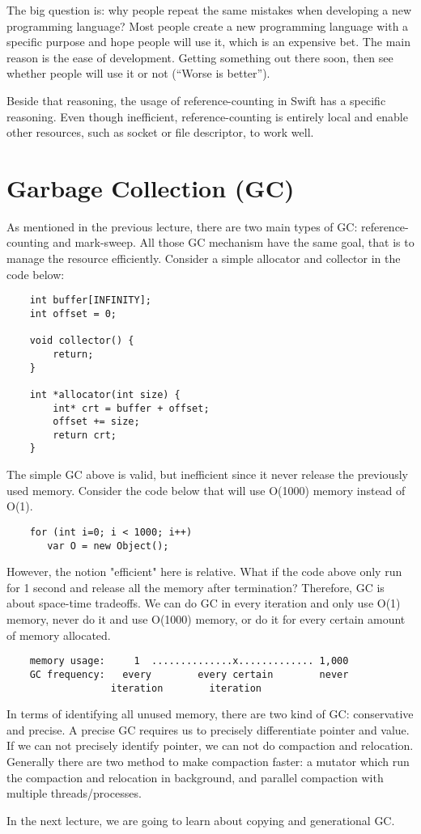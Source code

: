 \documentclass[twoside]{article}
\begin{document}
The big question is: why people repeat the same mistakes when developing a new programming language? Most people create a new programming language with a specific purpose and hope people will use it, which is an expensive bet. The main reason is the ease of development. Getting something out there soon, then see whether people will use it or not (“Worse is better”).

Beside that reasoning, the usage of reference-counting in Swift has a specific reasoning. Even though inefficient, reference-counting is entirely local and enable other resources, such as socket or file descriptor, to work well. 


\section{Garbage Collection (GC)}
As mentioned in the previous lecture, there are two main types of GC: reference-counting and mark-sweep. All those GC mechanism have the same goal, that is to manage the resource efficiently. Consider a simple allocator and collector in the code below:
\begin{verbatim}
    int buffer[INFINITY];
    int offset = 0;

    void collector() {
        return;
    }

    int *allocator(int size) {
        int* crt = buffer + offset;
        offset += size;
        return crt;
    }
\end{verbatim}

The simple GC above is valid, but inefficient since it never release the previously used memory. Consider the code below that will use O(1000) memory instead of O(1). 
\begin{verbatim}
    for (int i=0; i < 1000; i++)
       var O = new Object();
\end{verbatim}

However, the notion "efficient" here is relative. What if the code above only run for 1 second and release all the memory after termination? Therefore, GC is about space-time tradeoffs. We can do GC in every iteration and only use O(1) memory, never do it and use O(1000) memory, or do it for every certain amount of memory allocated.

\begin{verbatim}
    memory usage:     1  ..............x............. 1,000 
    GC frequency:   every        every certain        never
                  iteration        iteration
\end{verbatim}

In terms of identifying all unused memory, there are two kind of GC: conservative and precise. A precise GC requires us to precisely differentiate pointer and value. If we can not precisely identify pointer, we can not do compaction and relocation. Generally there are two method to make compaction faster: a mutator which run the compaction and relocation in background, and parallel compaction with multiple threads/processes.


In the next lecture, we are going to learn about copying and generational GC.
\end{document}
